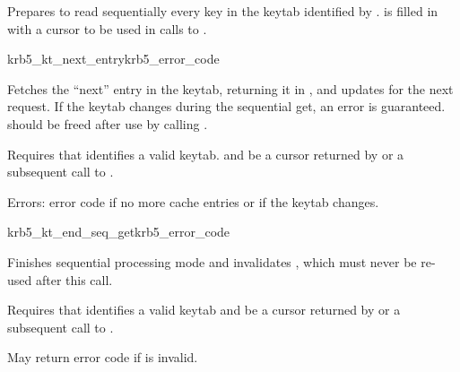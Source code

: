 Prepares to read sequentially every key in the keytab identified by
.
 is filled in with a cursor to be used in calls to
.

\begin{funcdecl}{krb5_kt_next_entry}{krb5_error_code}{\funcinout}
\funcout
{}
\funcinout
{}
\end{funcdecl}

Fetches the ``next'' entry in the keytab, returning it in
, and updates  for the next
request.  If the keytab changes during the sequential get, an error is
guaranteed.   should be freed after use by calling
.

Requires that  identifies a valid keytab.  and
 be a cursor returned by
 or a subsequent call to
.

Errors: error code if no more cache entries or if the keytab changes.

\begin{funcdecl}{krb5_kt_end_seq_get}{krb5_error_code}{\funcinout}
\end{funcdecl}

Finishes sequential processing mode and invalidates ,
which must never be re-used after this call.

Requires that  identifies a valid keytab  and
 be a cursor returned by
 or a subsequent call to
.

May return error code if  is invalid.


